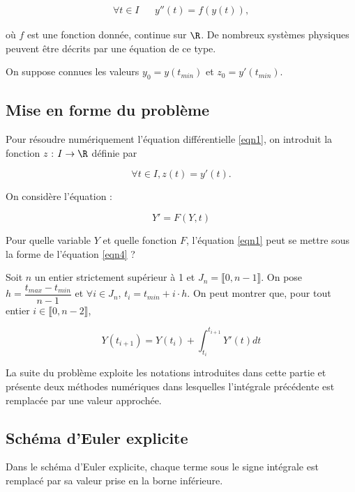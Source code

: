 \begin{align}\label{eqn1}
\forall t \in I && y''(t)=f(y(t)),
\end{align}

où $f$ est une fonction donnée, continue sur $\R$. De nombreux systèmes physiques peuvent être décrits par une
équation de ce type.

On suppose connues les valeurs $y_0 = y(t_{min})$ et $z_0 = y'(t_{min})$. 

\subsection{Mise en forme du problème}

Pour résoudre numériquement l'équation différentielle \eqref{eqn1}, on introduit la fonction $z$ : $I\to \R$ définie par 

\begin{equation}
\forall t\in I, z(t)=y'(t).
\end{equation}

On considère l'équation : 

\begin{equation}\label{eqn4}
Y'=F(Y,t)
\end{equation}

\question{} Pour quelle variable $Y$ et quelle fonction $F$, l'équation \eqref{eqn1} peut se mettre sous la forme de l'équation \eqref{eqn4} ?


Soit $n$ un entier strictement supérieur à 1 et $J_n=\llbracket 0,n-1 \rrbracket$.
On pose $h=\dfrac{t_{max}-t_{min}}{n-1}$ et $\forall i \in J_n$, $t_i=t_{min}+i\cdot h$. On peut montrer que, pour tout entier $i\in \llbracket 0,n-2 \rrbracket$,

\begin{equation}\label{eqn3}
\displaystyle
Y(t_{i+1})=Y(t_i)+\int_{t_i}^{t_{i+1}}Y'(t)dt
\end{equation}


La suite du problème exploite les notations introduites dans cette partie et présente deux méthodes numériques
dans lesquelles l'intégrale précédente est remplacée par une valeur approchée.

\subsection{Schéma d'Euler explicite}

Dans le schéma d'Euler explicite, chaque terme sous le signe intégrale est remplacé par sa valeur prise en la borne inférieure.


